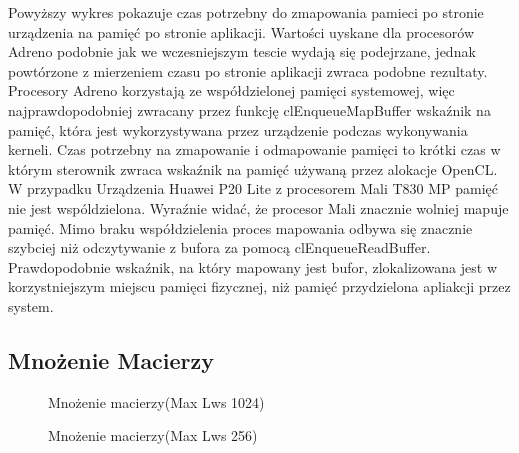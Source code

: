 Powyższy wykres pokazuje czas potrzebny do zmapowania pamieci po stronie urządzenia na pamięć po stronie aplikacji. Wartości uyskane dla procesorów Adreno podobnie jak we wczesniejszym tescie wydają się podejrzane, jednak powtórzone z mierzeniem czasu po stronie aplikacji zwraca podobne rezultaty. Procesory Adreno korzystają ze współdzielonej pamięci systemowej, więc najprawdopodobniej zwracany przez funkcję clEnqueueMapBuffer wskaźnik na pamięć, która jest wykorzystywana przez urządzenie podczas wykonywania kerneli. Czas potrzebny na zmapowanie i odmapowanie pamięci to krótki czas w którym sterownik zwraca wskaźnik na pamięć używaną przez alokacje OpenCL. W przypadku Urządzenia Huawei P20 Lite z procesorem Mali T830 MP pamięć nie jest wspóldzielona. Wyraźnie widać, że procesor Mali znacznie wolniej mapuje pamięć. Mimo braku współdzielenia proces mapowania odbywa się znacznie szybciej niż odczytywanie z bufora za pomocą clEnqueueReadBuffer. Prawdopodobnie wskaźnik, na który mapowany jest bufor, zlokalizowana jest w korzystniejszym miejscu pamięci fizycznej, niż pamięć przydzielona apliakcji przez system.

\subsection[Mnożenie Macierzy]{Mnożenie Macierzy}
\begin{figure}[H]
\caption{Mnożenie macierzy(Max Lws 1024)}
\end{figure}

\begin{figure}[H]
\caption{Mnożenie macierzy(Max Lws 256)}
\end{figure}

